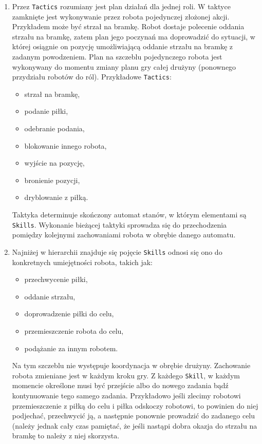 \begin{enumerate}
  \item Przez \texttt{Tactics} rozumiany jest plan działań dla jednej roli. W taktyce zamknięte jest wykonywanie przez robota pojedynczej złożonej akcji.
  Przykładem może być strzał na bramkę. Robot dostaje polecenie oddania strzału na bramkę, zatem plan jego poczynań ma doprowadzić
 do sytuacji, w której osiągnie on pozycję umożliwiającą oddanie strzału na bramkę z zadanym powodzeniem.
 Plan na szczeblu pojedynczego robota jest wykonywany do momentu zmiany planu gry całej drużyny (ponownego przydziału robotów do ról).
 Przykładowe \texttt{Tactics}:
 \begin{itemize}
  \item strzał na bramkę,
  \item podanie piłki,
  \item odebranie podania,
  \item blokowanie innego robota,
  \item wyjście na pozycję,
  \item bronienie pozycji,
  \item dryblowanie z piłką.
 \end{itemize}
  Taktyka determinuje skończony automat stanów, w którym elementami są \texttt{Skills}. Wykonanie bieżącej taktyki sprowadza się do przechodzenia pomiędzy kolejnymi zachowaniami robota w obrębie
  danego automatu.
  \item Najniżej w hierarchii znajduje się pojęcie \texttt{Skills} odnosi się ono do konkretnych umiejętności robota, takich jak:
    \begin{itemize}
    \item przechwycenie piłki,
    \item oddanie strzału,
    \item doprowadzenie piłki do celu,
    \item przemieszczenie robota do celu,
    \item podążanie za innym robotem.
    \end{itemize}
  Na tym szczeblu nie występuje koordynacja w obrębie drużyny. Zachowanie robota zmieniane jest w każdym kroku gry. Z każdego \texttt{Skill}, w każdym momencie określone musi być przejście
  albo do nowego zadania bądź kontynuowanie tego samego zadania. Przykładowo jeśli zlecimy robotowi przemieszczenie z piłką do celu i piłka 
  odskoczy robotowi, to powinien do niej podjechać, przechwycić ją, a następnie ponownie prowadzić do zadanego celu (należy jednak cały czas pamiętać, że jeśli nastąpi dobra okazja do strzału
na bramkę to należy z niej skorzysta.
\end{enumerate}

